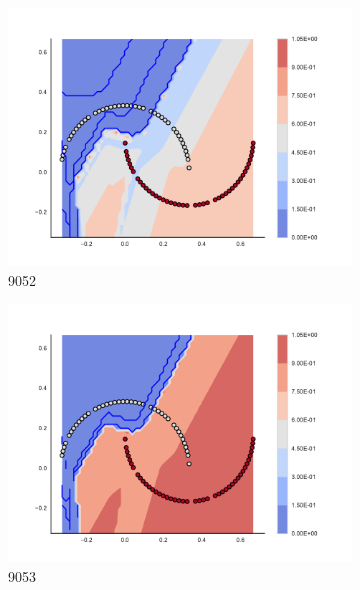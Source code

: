 \begin{figure}[h]
\begin{subfigure}[b]{0.09\textwidth}
    \includegraphics[clip, trim=2.35cm 1.75cm 4.5cm 0cm,width=\textwidth]{img/convergence/9052.pdf}
    \caption{9052}
    \label{fig:convergence_9052}
\end{subfigure}
%
\begin{subfigure}[b]{0.09\textwidth}
    \includegraphics[clip, trim=2.35cm 1.75cm 4.5cm 0cm,width=\textwidth]{img/convergence/9053.pdf}
    \caption{9053}
    \label{fig:convergence_9053}
\end{subfigure}
%
\begin{subfigure}[b]{0.09\textwidth}

\end{subfigure}
\end{figure}
